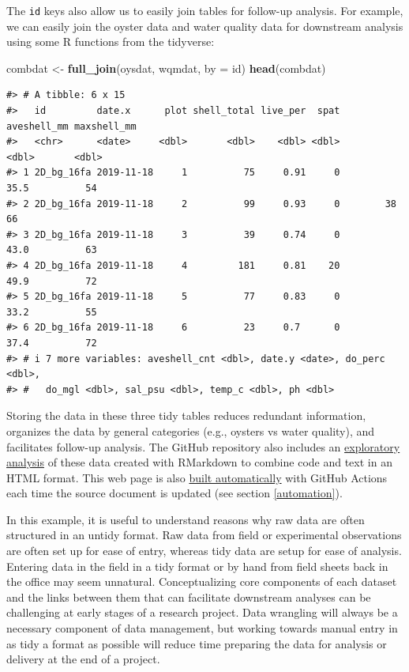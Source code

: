 \documentclass[
]{book}
\newenvironment{Shaded}{\begin{snugshade}}{\end{snugshade}}
\newcommand{\AttributeTok}[1]{\textcolor[rgb]{0.13,0.29,0.53}{#1}}
\newcommand{\FunctionTok}[1]{\textcolor[rgb]{0.13,0.29,0.53}{\textbf{#1}}}
\newcommand{\NormalTok}[1]{#1}
\newcommand{\OtherTok}[1]{\textcolor[rgb]{0.56,0.35,0.01}{#1}}
\newcommand{\StringTok}[1]{\textcolor[rgb]{0.31,0.60,0.02}{#1}}
\begin{document}
The \texttt{id} keys also allow us to easily join tables for follow-up analysis. For example, we can easily join the oyster data and water quality data for downstream analysis using some R functions from the tidyverse:

\begin{Shaded}
\begin{Highlighting}[]
\NormalTok{combdat }\OtherTok{\textless{}{-}} \FunctionTok{full\_join}\NormalTok{(oysdat, wqmdat, }\AttributeTok{by =} \StringTok{\textquotesingle{}id\textquotesingle{}}\NormalTok{)}
\FunctionTok{head}\NormalTok{(combdat)}
\end{Highlighting}
\end{Shaded}

\begin{verbatim}
#> # A tibble: 6 x 15
#>   id         date.x      plot shell_total live_per  spat aveshell_mm maxshell_mm
#>   <chr>      <date>     <dbl>       <dbl>    <dbl> <dbl>       <dbl>       <dbl>
#> 1 2D_bg_16fa 2019-11-18     1          75     0.91     0        35.5          54
#> 2 2D_bg_16fa 2019-11-18     2          99     0.93     0        38            66
#> 3 2D_bg_16fa 2019-11-18     3          39     0.74     0        43.0          63
#> 4 2D_bg_16fa 2019-11-18     4         181     0.81    20        49.9          72
#> 5 2D_bg_16fa 2019-11-18     5          77     0.83     0        33.2          55
#> 6 2D_bg_16fa 2019-11-18     6          23     0.7      0        37.4          72
#> # i 7 more variables: aveshell_cnt <dbl>, date.y <date>, do_perc <dbl>,
#> #   do_mgl <dbl>, sal_psu <dbl>, temp_c <dbl>, ph <dbl>
\end{verbatim}

Storing the data in these three tidy tables reduces redundant information, organizes the data by general categories (e.g., oysters vs water quality), and facilitates follow-up analysis. The GitHub repository also includes an \href{https://tbep-tech.github.io/tberf-oyster/figures.html}{exploratory analysis} of these data created with RMarkdown \citep{Xie18} to combine code and text in an HTML format. This web page is also \href{https://github.com/tbep-tech/tberf-oyster/actions}{built automatically} with GitHub Actions each time the source document is updated (see section \ref{automation}).

In this example, it is useful to understand reasons why raw data are often structured in an untidy format. Raw data from field or experimental observations are often set up for ease of entry, whereas tidy data are setup for ease of analysis. Entering data in the field in a tidy format or by hand from field sheets back in the office may seem unnatural. Conceptualizing core components of each dataset and the links between them that can facilitate downstream analyses can be challenging at early stages of a research project. Data wrangling will always be a necessary component of data management, but working towards manual entry in as tidy a format as possible will reduce time preparing the data for analysis or delivery at the end of a project.
\end{document}
